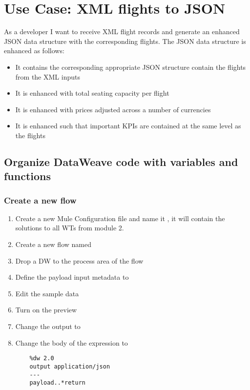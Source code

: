 \chapter{ Use Case: XML flights to JSON }
As a developer I want to receive XML flight records and generate an enhanced JSON data structure with the corresponding flights.
\newline
The JSON data structure is enhanced as follows:
\begin{itemize}
\item It contains the corresponding appropriate JSON structure contain the flights from the XML inputs
\item It is enhanced with total seating capacity per flight
\item It is enhanced with prices adjusted across a number of currencies
\item It is enhanced such that important KPIs are contained at the same level as the flights
\end{itemize}
\section{Organize DataWeave code with variables and functions}

\subsection{Create a new flow}
\begin{enumerate}
\item Create a new Mule Configuration file and name it , it will contain the solutions to all WTs from module 2.
\item Create a new flow named 
\item Drop a DW to the process area of the flow
\item Define the payload input metadata to  
\item Edit the sample data
\item Turn on the preview
\item Change the output to 
\item Change the body of the expression to
  \begin{verbatim}
    %dw 2.0
    output application/json
    ---
    payload..*return
  \end{verbatim}
\end{enumerate}


